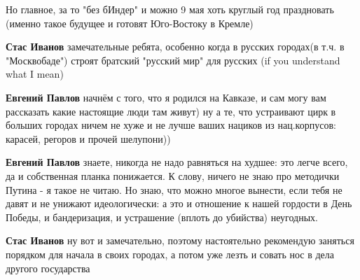 \begin{itemize}
\begin{itemize}
Но главное, за то "без бИндер" и можно 9 мая хоть круглый год праздновать
(именно такое будущее и готовят Юго-Востоку в Кремле)


 
\textbf{Стас Иванов} замечательные ребята, особенно когда в русских городах(в т.ч. в "Москвобаде") строят братский "русский мир" для русских (if you understand what I mean)

 
\textbf{Евгений Павлов} начнём с того, что я родился на Кавказе, и сам могу вам рассказать какие настоящие люди там живут) ну а те, что устраивают цирк в больших городах ничем не хуже и не лучше ваших нациков из нац.корпусов: карасей, регоров и прочей шелупони))

 
\textbf{Евгений Павлов} знаете, никогда не надо равняться на худшее: это легче всего, да и собственная планка понижается. К слову, ничего не знаю про методички Путина - я такое не читаю. Но знаю, что можно многое вынести, если тебя не давят и не унижают идеологически: а это и отношение к нашей гордости в День Победы, и бандеризация, и устрашение (вплоть до убийства) неугодных.

 
\textbf{Стас Иванов} ну вот и замечательно, поэтому настоятельно рекомендую заняться порядком для начала в своих городах, а потом уже лезть и совать нос в дела другого государства

 

\end{itemize}
\end{itemize}
